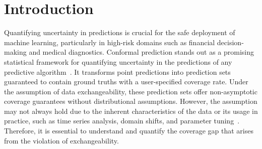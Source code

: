 \documentclass{article}
\newcommand{\1}{\mathbbm{1}}
\theoremstyle{plain}
\theoremstyle{definition}
\theoremstyle{remark}
\begin{document}
\printAffiliationsAndNotice{\icmlEqualContribution}  

\begin{abstract}
Conformal prediction is a popular framework of uncertainty quantification that constructs prediction sets with coverage guarantees.
To uphold the exchangeability assumption, many conformal prediction methods necessitate an additional hold-out set for parameter tuning.
Yet, the impact of violating this principle on coverage remains underexplored, making it ambiguous in practical applications. 
In this work, we empirically find that the tuning bias - the coverage gap introduced by leveraging the same dataset for tuning and calibration, is negligible for simple parameter tuning in many conformal prediction methods. 
In particular, we observe the scaling law of the tuning bias: this bias increases with parameter space complexity and decreases with calibration set size.
Formally, we establish a theoretical framework to quantify the tuning bias and provide rigorous proof for the scaling law of the tuning bias by deriving its upper bound.
In the end, we discuss how to reduce the tuning bias, guided by the theories we developed. 
\end{abstract}

\section{Introduction}
\label{sec:introduction}
Quantifying uncertainty in predictions is crucial for the safe deployment of machine learning, particularly in high-risk domains such as financial decision-making and medical diagnostics. 
Conformal prediction stands out as a promising statistical framework for quantifying uncertainty in the predictions of any predictive algorithm~\citep{vovk2005algorithmic, papadopoulos2008inductive, vovk2012conditional}.
It transforms point predictions into prediction sets guaranteed to contain ground truths with a user-specified coverage rate. 
Under the assumption of data exchangeability, these prediction sets offer non-asymptotic coverage guarantees without distributional assumptions.
However, the assumption may not always hold due to the inherent characteristics of the data or its usage in practice, such as time series analysis, domain shifts, and parameter tuning~\citep{barber2023conformal, oliveira2024split}.
Therefore, it is essential to understand and quantify the coverage gap that arises from the violation of exchangeability.
\end{document}
